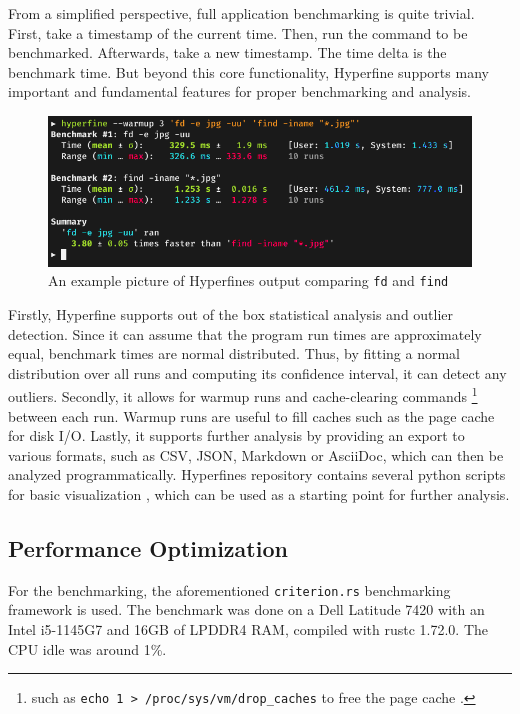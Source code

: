 From a simplified perspective, full application benchmarking is quite trivial. First, take a timestamp of the current time. Then, run the command to be benchmarked. Afterwards, take a new timestamp. The time delta is the benchmark time. But beyond this core functionality, Hyperfine supports many important and fundamental features for proper benchmarking and analysis.\\

\begin{figure}[H]
  \centering
  \includegraphics[width=\textwidth]{./assets/hyperfine.png}
  \caption{An example picture of Hyperfines output comparing \texttt{fd} and \texttt{find} \cite{hyperfine}}
\end{figure}

Firstly, Hyperfine supports out of the box statistical analysis and outlier detection. Since it can assume that the program run times are approximately equal, benchmark times are normal distributed. Thus, by fitting a normal distribution over all runs and computing its confidence interval, it can detect any outliers. Secondly, it allows for warmup runs and cache-clearing commands \footnote{such as \texttt{echo 1 > /proc/sys/vm/drop\_caches} to free the page cache \cite{kernel}.} between each run. Warmup runs are useful to fill caches such as the page cache for disk I/O. Lastly, it supports further analysis by providing an export to various formats, such as CSV, JSON, Markdown or AsciiDoc, which can then be analyzed programmatically. Hyperfines repository contains several python scripts for basic visualization \cite{hyperfinescripts}, which can be used as a starting point for further analysis.

\subsection{Performance Optimization}
For the benchmarking, the aforementioned \texttt{criterion.rs} benchmarking framework is used. The benchmark was done on a Dell Latitude 7420 with an Intel i5-1145G7 and 16GB of LPDDR4 RAM, compiled with rustc 1.72.0. The CPU idle was around 1\%.

